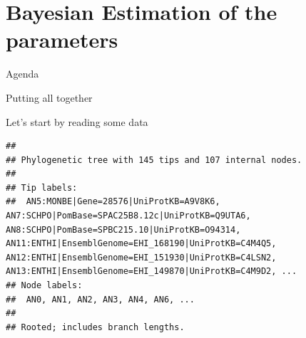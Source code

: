 \documentclass[9pt,ignorenonframetext,]{beamer}
\newenvironment{Shaded}{\begin{snugshade}}{\end{snugshade}}
\newcommand{\KeywordTok}[1]{\textcolor[rgb]{0.94,0.87,0.69}{#1}}
\newcommand{\DataTypeTok}[1]{\textcolor[rgb]{0.87,0.87,0.75}{#1}}
\newcommand{\StringTok}[1]{\textcolor[rgb]{0.80,0.58,0.58}{#1}}
\newcommand{\CommentTok}[1]{\textcolor[rgb]{0.50,0.62,0.50}{#1}}
\newcommand{\OperatorTok}[1]{\textcolor[rgb]{0.94,0.94,0.82}{#1}}
\newcommand{\NormalTok}[1]{\textcolor[rgb]{0.80,0.80,0.80}{#1}}
\begin{document}
\section{Bayesian Estimation of the
parameters}\label{bayesian-estimation-of-the-parameters}

\begin{frame}[t]{Agenda}

\tableofcontents[currentsection]

\end{frame}

\begin{frame}[fragile]{Putting all together}

Let's start by reading some data

\footnotesize

\begin{Shaded}
\end{Shaded}

\begin{verbatim}
## 
## Phylogenetic tree with 145 tips and 107 internal nodes.
## 
## Tip labels:
##  AN5:MONBE|Gene=28576|UniProtKB=A9V8K6, AN7:SCHPO|PomBase=SPAC25B8.12c|UniProtKB=Q9UTA6, AN8:SCHPO|PomBase=SPBC215.10|UniProtKB=O94314, AN11:ENTHI|EnsemblGenome=EHI_168190|UniProtKB=C4M4Q5, AN12:ENTHI|EnsemblGenome=EHI_151930|UniProtKB=C4LSN2, AN13:ENTHI|EnsemblGenome=EHI_149870|UniProtKB=C4M9D2, ...
## Node labels:
##  AN0, AN1, AN2, AN3, AN4, AN6, ...
## 
## Rooted; includes branch lengths.
\end{verbatim}

\normalsize

\end{frame}
\end{document}
